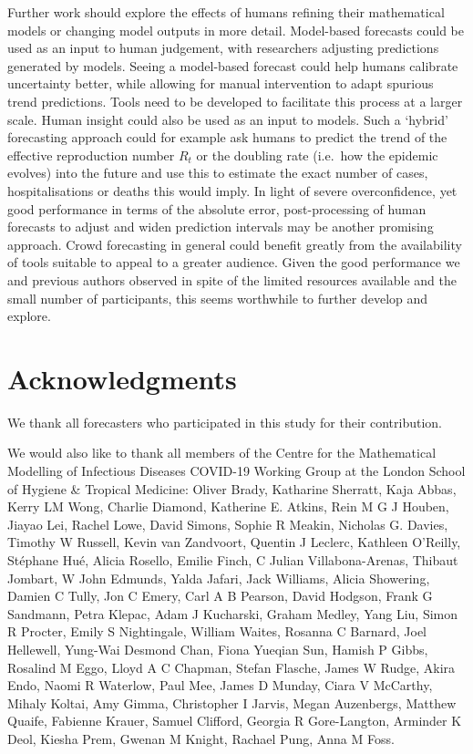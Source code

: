 \documentclass[10pt,letterpaper]{article}
\begin{document}
Further work should explore the effects of humans refining their
mathematical models or changing model outputs in more detail.
Model-based forecasts could be used as an input to human judgement, with
researchers adjusting predictions generated by models. Seeing a
model-based forecast could help humans calibrate uncertainty better,
while allowing for manual intervention to adapt spurious trend
predictions. Tools need to be developed to facilitate this process at a
larger scale. Human insight could also be used as an input to models.
Such a `hybrid' forecasting approach could for example ask humans to
predict the trend of the effective reproduction number \(R_t\) or the
doubling rate (i.e.~how the epidemic evolves) into the future and use
this to estimate the exact number of cases, hospitalisations or deaths
this would imply. In light of severe overconfidence, yet good
performance in terms of the absolute error, post-processing of human
forecasts to adjust and widen prediction intervals may be another
promising approach. Crowd forecasting in general could benefit greatly
from the availability of tools suitable to appeal to a greater audience.
Given the good performance we and previous authors observed in spite of
the limited resources available and the small number of participants,
this seems worthwhile to further develop and explore.

\clearpage

\section*{Acknowledgments}

We thank all forecasters who participated in this study for their
contribution.

We would also like to thank all members of the Centre for the
Mathematical Modelling of Infectious Diseases COVID-19 Working Group at
the London School of Hygiene \& Tropical Medicine: Oliver Brady,
Katharine Sherratt, Kaja Abbas, Kerry LM Wong, Charlie Diamond,
Katherine E. Atkins, Rein M G J Houben, Jiayao Lei, Rachel Lowe, David
Simons, Sophie R Meakin, Nicholas G. Davies, Timothy W Russell, Kevin
van Zandvoort, Quentin J Leclerc, Kathleen O'Reilly, Stéphane Hué,
Alicia Rosello, Emilie Finch, C Julian Villabona-Arenas, Thibaut
Jombart, W John Edmunds, Yalda Jafari, Jack Williams, Alicia Showering,
Damien C Tully, Jon C Emery, Carl A B Pearson, David Hodgson, Frank G
Sandmann, Petra Klepac, Adam J Kucharski, Graham Medley, Yang Liu, Simon
R Procter, Emily S Nightingale, William Waites, Rosanna C Barnard, Joel
Hellewell, Yung-Wai Desmond Chan, Fiona Yueqian Sun, Hamish P Gibbs,
Rosalind M Eggo, Lloyd A C Chapman, Stefan Flasche, James W Rudge, Akira
Endo, Naomi R Waterlow, Paul Mee, James D Munday, Ciara V McCarthy,
Mihaly Koltai, Amy Gimma, Christopher I Jarvis, Megan Auzenbergs,
Matthew Quaife, Fabienne Krauer, Samuel Clifford, Georgia R
Gore-Langton, Arminder K Deol, Kiesha Prem, Gwenan M Knight, Rachael
Pung, Anna M Foss.
\end{document}
